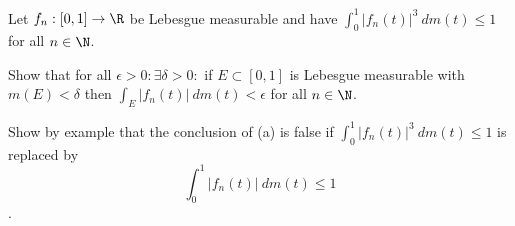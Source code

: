 Let $f_n:[0,1]\rightarrow \R$ be Lebesgue measurable and have
$\int_0^1|f_n(t)|^3\ dm(t)\leq 1$ for all $n\in \N$.
\begin{alist}
\item Show that for all $\epsilon>0:\exists \delta>0:$ if $E\subset
[0,1]$ is Lebesgue measurable with $m(E)<\delta$ then
$\int_E|f_n(t)|\ dm(t)<\epsilon$ for all $n\in \N$.
\item Show by example that the conclusion of (a) is false if
$\int_0^1|f_n(t)|^3\ dm(t)\leq 1$ is replaced by $$\int_0^1|f_n(t)|
\ dm(t)\leq 1$$.
\end{alist}
